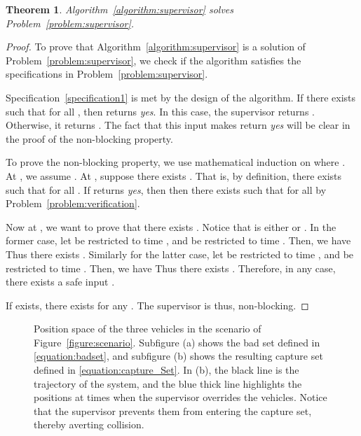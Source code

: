 \documentclass{sig-alternate}
\newtheorem{theorem}{Theorem}
\begin{document}
\begin{theorem}
	Algorithm~\ref{algorithm:supervisor} solves Problem~\ref{problem:supervisor}.
\end{theorem}
\begin{proof}
	To prove that Algorithm~\ref{algorithm:supervisor} is a solution of Problem~\ref{problem:supervisor}, we check if the algorithm satisfies the specifications in Problem~\ref{problem:supervisor}.
	
	Specification~\ref{specification1} is met by the design of the algorithm. If there exists  such that  for all , then  returns \textit{yes}. In this case, the supervisor returns . Otherwise, it returns . The fact that this input makes  return \textit{yes} will be clear in the proof of the non-blocking property. 
	
	To prove the non-blocking property, we use mathematical induction on  where . At , we assume . At , suppose there exists . That is, by definition, there exists  such that  for all . If  returns \textit{yes}, then then there exists  such that  for all  by Problem~\ref{problem:verification}. 
	
	Now at , we want to prove that there exists . Notice that  is either  or . In the former case, let  be  restricted to time , and  be  restricted to time . Then, we have  Thus there exists . Similarly for the latter case, let  be  restricted to time , and  be  restricted to time . Then, we have
	 Thus there exists . Therefore, in any case, there exists a safe input .
	
	If  exists, there exists  for any . The supervisor is thus, non-blocking.
	\end{proof}
	\begin{figure*}[htb!]
	\centering
	\quad
	
	\caption{Position space of the three vehicles in the scenario of Figure~\ref{figure:scenario}. Subfigure (a) shows the bad set defined in \eqref{equation:badset}, and subfigure (b) shows the resulting capture set defined in \eqref{equation:capture_Set}. In (b), the black line is the trajectory of the system, and the blue thick line highlights the positions at times when the supervisor overrides the vehicles. Notice that the supervisor prevents them from entering the capture set, thereby averting collision.}
	\label{figure:3D}
	\end{figure*}
\end{document}
